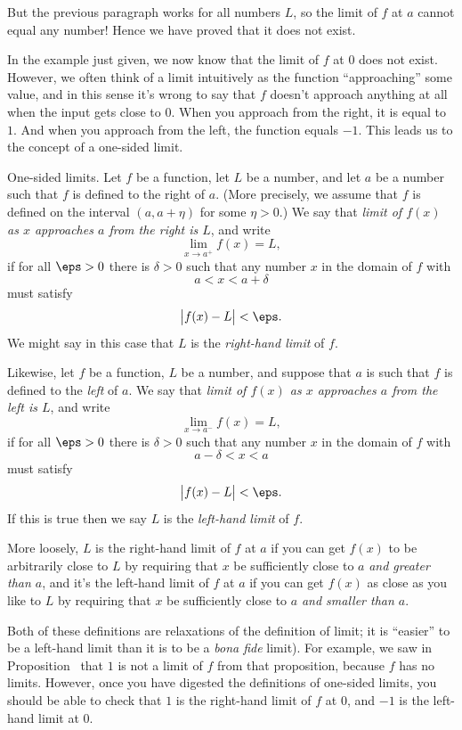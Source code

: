 But the previous paragraph works for all numbers $L$, so the limit of $f$ at $a$ cannot equal
any number! Hence we have proved that it does not exist.\slug

In the example just given, we now know that the limit of $f$ at $0$ does not exist.
However, we
often think of a limit intuitively as the function ``approaching'' some value, and in this sense it's wrong to
say that $f$ doesn't approach anything at all when the input gets close to $0$. When you approach from
the right, it is equal to $1$. And when you approach from
the left, the function equals $-1$. This leads us to the concept of a one-sided limit.

\medskip\boldlabel One-sided limits.
Let $f$ be a function, let $L$ be a number, and let $a$ be a number such that $f$ is defined to the right of $a$.
(More precisely, we assume that $f$ is defined on the interval $(a,a+\eta)$ for some $\eta>0$.)
We say that {\it limit of $f(x)$ as $x$ approaches $a$ from the right is $L$}, and write
$$\lim_{x\to a^+} f(x) = L,$$
if for all $\eps>0$ there is $\delta>0$ such that any number $x$ in the domain of $f$ with
$$a < x < a+\delta$$
must satisfy
$$ \bigl| f(x) - L\bigr| < \eps.$$
We might say in this case that $L$ is the {\it right-hand limit} of $f$.

Likewise, let $f$ be a function, $L$ be a number, and suppose that $a$ is such that $f$ is defined
to the {\it left} of $a$.
We say that {\it limit of $f(x)$ as $x$ approaches $a$ from the left is $L$}, and write
$$\lim_{x\to a^-} f(x) = L,$$
if for all $\eps>0$ there is $\delta>0$ such that any number $x$ in the domain of $f$ with
$$a-\delta < x < a$$
must satisfy
$$ \bigl| f(x) - L\bigr| < \eps.$$
If this is true then we say $L$ is the {\it left-hand limit} of $f$.

More loosely, $L$ is the right-hand limit of $f$ at $a$ if you can get $f(x)$ to be arbitrarily close to $L$ by
requiring that $x$ be sufficiently close to $a$ {\it and greater than $a$},
and it's the left-hand limit of $f$ at $a$ if you can get $f(x)$ as close as you like to $L$
by requiring that $x$ be sufficiently close to $a$ {\it and smaller than $a$}.

Both of these definitions are relaxations of the definition of limit; it is ``easier'' to be a left-hand
limit than it is to be a {\it bona fide} limit). For example, we saw in Proposition~{\proplimdne}
that $1$ is not a limit of $f$ from that proposition, because $f$ has no limits.
However, once you have digested the definitions of one-sided limits, you should be able to
check that $1$ is the right-hand limit of $f$ at $0$, and $-1$ is the left-hand limit at $0$.

